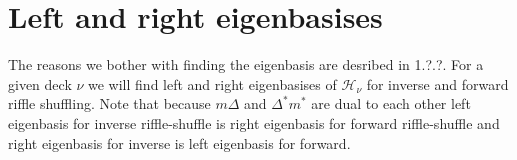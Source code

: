\documentclass[a4paper, 12pt]{article}
\begin{document}
\section{Left and right eigenbasises}

The reasons we bother with finding the eigenbasis are desribed in 1.?.?. For a given deck $\nu$
we will find left and right eigenbasises of $\mathcal{H}_\nu$ for inverse and forward riffle shuffling.
Note that because
$m\Delta$ and $\Delta^*m^*$ are dual to each other left eigenbasis for inverse riffle-shuffle is right
eigenbasis for forward riffle-shuffle and right eigenbasis for inverse is left eigenbasis for forward.
\end{document}
